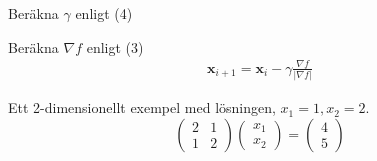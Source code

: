 \documentclass{article}
\begin{document}
    Beräkna $\gamma $ enligt (4)

    Beräkna $\nabla f$ enligt (3)
\begin{gather*}
        \mathbf{x}_{i+1} = \mathbf{x}_i - \gamma \frac{\nabla f}{\left\lvert \nabla f\right\rvert } 
\end{gather*}


\newpage
Ett 2-dimensionellt exempel med lösningen, $x_1 = 1, x_2 = 2$.
\begin{equation*}
\left(
    \begin{matrix}
        2 & 1 \\
        1 & 2
    \end{matrix}
    \right) 
\left(
    \begin{matrix}
        x_1 \\
        x_2
    \end{matrix}
\right) = 
\left(
    \begin{matrix}
        4 \\
        5
    \end{matrix}
\right)
\end{equation*}
\end{document}
